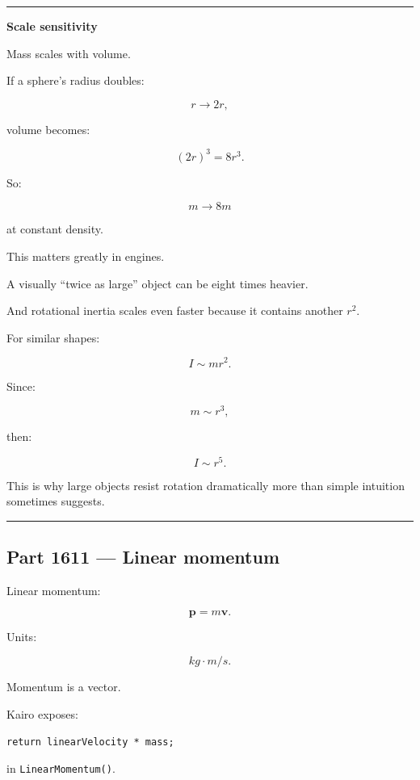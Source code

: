 \begin{center}\rule{0.5\linewidth}{0.5pt}\end{center}

\textbf{Scale sensitivity}

Mass scales with volume.

If a sphere's radius doubles:

\[
r\rightarrow2r,
\]

volume becomes:

\[
(2r)^3=8r^3.
\]

So:

\[
m\rightarrow8m
\]

at constant density.

This matters greatly in engines.

A visually ``twice as large'' object can be eight times heavier.

And rotational inertia scales even faster because it contains another \(r^2\).

For similar shapes:

\[
I\sim mr^2.
\]

Since:

\[
m\sim r^3,
\]

then:

\[
\boxed{
I\sim r^5.
}
\]

This is why large objects resist rotation dramatically more than simple intuition sometimes suggests.

\begin{center}\rule{0.5\linewidth}{0.5pt}\end{center}

\subsection{Part 1611 --- Linear momentum}\label{06-engine-ii-ch034-part-1611-linear-momentum}

Linear momentum:

\[
\boxed{
\mathbf{p}=m\mathbf{v}.
}
\]

Units:

\[
kg\cdot m/s.
\]

Momentum is a vector.

Kairo exposes:

\begin{verbatim}
return linearVelocity * mass;
\end{verbatim}

in \texttt{LinearMomentum()}.

